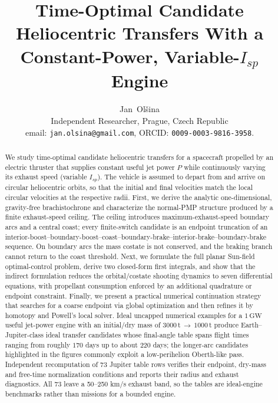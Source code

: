 \documentclass[journal,a4paper]{IEEEtran}
\date{}
\newcommand{\SI}[2]{\ensuremath{#1\,\mathrm{#2}}}
\begin{document}
\title{Time-Optimal Candidate Heliocentric Transfers With a Constant-Power, Variable-$I_{\!sp}$ Engine}

\author{Jan~Ol\v{s}ina\\[1ex] Independent Researcher, Prague, Czech Republic\\
email: \texttt{jan.olsina@gmail.com},  ORCID: \texttt{0009-0003-9816-3958}.}


\maketitle

\begin{abstract}
We study time-optimal candidate heliocentric transfers for a spacecraft propelled by an electric thruster that supplies constant useful jet power \(P\) while continuously varying its exhaust speed (variable \(I_{\!sp}\)). The vehicle is assumed to depart from and arrive on circular heliocentric orbits, so that the initial and final velocities match the local circular velocities at the respective radii. First, we derive the analytic one-dimensional, gravity-free brachistochrone and characterize the normal-PMP structure produced by a finite exhaust-speed ceiling. The ceiling introduces maximum-exhaust-speed boundary arcs and a central coast; every finite-switch candidate is an endpoint truncation of an interior-boost--boundary-boost--coast--boundary-brake--interior-brake--boundary-brake sequence. On boundary arcs the mass costate is not conserved, and the braking branch cannot return to the coast threshold. Next, we formulate the full planar Sun-field optimal-control problem, derive two closed-form first integrals, and show that the indirect formulation reduces the orbital/costate shooting dynamics to seven differential equations, with propellant consumption enforced by an additional quadrature or endpoint constraint. Finally, we present a practical numerical continuation strategy that searches for a coarse endpoint via global optimization and then refines it by homotopy and Powell's local solver. Ideal uncapped numerical examples for a \SI{1}{GW} useful jet-power engine with an initial/dry mass of \SI{3000}{t}\,\(\to\)\,\SI{1000}{t} produce Earth--Jupiter-class ideal transfer candidates whose final-angle table spans flight times ranging from roughly \(170\) days up to about \(220\) days; the longer-arc candidates highlighted in the figures commonly exploit a low-perihelion Oberth-like pass. Independent recomputation of 73 Jupiter table rows verifies their endpoint, dry-mass and free-time normalization conditions and reports their radius and exhaust diagnostics. All 73 leave a 50--250 km/s exhaust band, so the tables are ideal-engine benchmarks rather than missions for a bounded engine.
\end{abstract}
\end{document}
